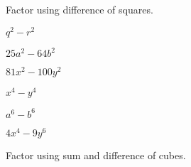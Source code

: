 \documentclass{report}
\theoremstyle{definition}
\begin{document}
\noindent Factor using difference of squares.\\

\begin{enumerate}
\setcounter{enumi}{4}
	\begin{minipage}[t]{0.45\linewidth}
	\item $q^2-r^2$ \\
	
	\vspace{3cm}
	\item $25a^2-64b^2$\\
	
	\vspace{3cm}
	\item $81x^2-100y^2$\\
	
	\vspace{3cm}	
	\end{minipage}
	\hfill
	\begin{minipage}[t]{0.45\linewidth}
	\item $x^4-y^4$\\
	
	\vspace{3cm}
	\item $a^6-b^6$\\
	
	\vspace{3cm}
	\item $4x^4-9y^6$\\
	
	\vspace{3cm}
	\end{minipage}
\end{enumerate}

 \newpage

\noindent Factor using sum and  difference of cubes.\\
\end{document}
